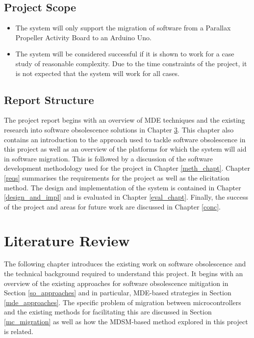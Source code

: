\documentclass{UoYCSproject}
\begin{document}
\section{Project Scope}
\begin{itemize}
\item The system will only support the migration of software from a Parallax Propeller Activity Board to an Arduino Uno.
\item The system will be considered successful if it is shown to work for a case study of reasonable complexity. Due to the time constraints of the project, it is not expected that the system will work for all cases.
\end{itemize}

\section{Report Structure}
The project report begins with an overview of MDE techniques and the existing research into software obsolescence solutions in Chapter \ref{lit_review}. This chapter also contains an introduction to the approach used to tackle software obsolescence in this project as well as an overview of the platforms for which the system will aid in software migration. This is followed by
a discussion of the software development methodology used for the project in Chapter \ref{meth_chapt}. Chapter \ref{reqs} summarises the requirements for the project as well as the elicitation method. The design and implementation of the system is contained in Chapter \ref{design_and_impl} and is evaluated in Chapter \ref{eval_chapt}. Finally, the success  of the project and areas for future work are discussed in Chapter \ref{conc}.

\chapter{Literature Review} \label{lit_review}
The following chapter introduces the existing work on software obsolescence and the technical background required to understand this project. It begins with an overview of the existing approaches for software obsolescence mitigation in Section \ref{so_approaches} and in particular, MDE-based strategies in Section \ref{mde_approaches}. The specific problem of migration between microcontrollers and the existing methods for facilitating this are discussed in Section \ref{mc_migration} as well as how the MDSM-based method explored in this project is related. 
\end{document}
